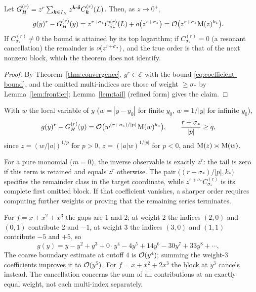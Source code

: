 \begin{theorem}
\label{thm:remainder}
Let $G^{(r)}_H=z^r\sum_{\boldsymbol k\in I_H}z^{\boldsymbol k\cdot\boldsymbol\delta}C^{(r)}_{\boldsymbol k}(L)$. Then, as $z\to0^+$,
\begin{equation}
 g(y)^r-G^{(r)}_H(y)=z^{r+\sigma_*}C^{(r)}_{\sigma_*}(L)+o\bigl(z^{r+\sigma_*}\bigr)
 =\mathcal O\bigl(z^{r+\sigma_*}\mathrm M(z)^{k_*}\bigr).
 \label{eq:remainder}
\end{equation}
If $C^{(r)}_{\sigma_*}\ne0$ the bound is attained by its top logarithm; if $C^{(r)}_{\sigma_*}=0$ (a resonant cancellation) the remainder is $o(z^{r+\sigma_*})$, and the true order is that of the next nonzero block, which the theorem does not identify.
\end{theorem}
\begin{proof}
By Theorem~\ref{thm:convergence}, $g^r\in\mathcal E$ with the bound \eqref{eq:coefficient-bound}, and the omitted multi-indices are those of weight $\ge\sigma_*$ by Lemma~\ref{lem:frontier}; Lemma~\ref{lem:tail} (refined form) gives the claim.
\end{proof}

\begin{corollary}
\label{cor:remainder-y}
With $w$ the local variable of $y$ ($w=|y-y_0|$ for finite $y_0$, $w=1/|y|$ for infinite $y_0$),
\[
 g(y)^r-G^{(r)}_H(y)=\mathcal O\bigl(w^{(r+\sigma_*)/|p|}\,\mathrm M(w)^{k_*}\bigr),\qquad\frac{r+\sigma_*}{|p|}\ge q ,
\]
since $z=(w/|a|)^{1/p}$ for $p>0$, $z=(|a|w)^{1/|p|}$ for $p<0$, and $\mathrm M(z)\asymp\mathrm M(w)$.
\end{corollary}

For a pure monomial ($m=0$), the inverse observable is exactly $z^r$: the tail is zero if this term is retained and equals $z^r$ otherwise. The pair $\bigl((r+\sigma_*)/|p|,k_*\bigr)$ specifies the remainder class in the target coordinate, while $z^{r+\sigma_*}C^{(r)}_{\sigma_*}$ is its complete first omitted block. If that coefficient vanishes, a sharper order requires computing further weights or proving that the remaining series terminates.

\begin{example}[Resonances]
For $f=x+x^2+x^3$ the gaps are $1$ and $2$; at weight $2$ the indices $(2,0)$ and $(0,1)$ contribute $2$ and $-1$, at weight $3$ the indices $(3,0)$ and $(1,1)$ contribute $-5$ and $+5$, so
\[
 g(y)=y-y^2+y^3+0\cdot y^4-4y^5+14y^6-30y^7+33y^8+\cdots ,
\]
The coarse boundary estimate at cutoff $4$ is $\mathcal O(y^4)$; summing the weight-$3$ coefficients improves it to $\mathcal O(y^5)$. For $f=x+x^2+2x^3$ the block at $y^3$ cancels instead. The cancellation concerns the sum of all contributions at an exactly equal weight, not each multi-index separately.
\end{example}

